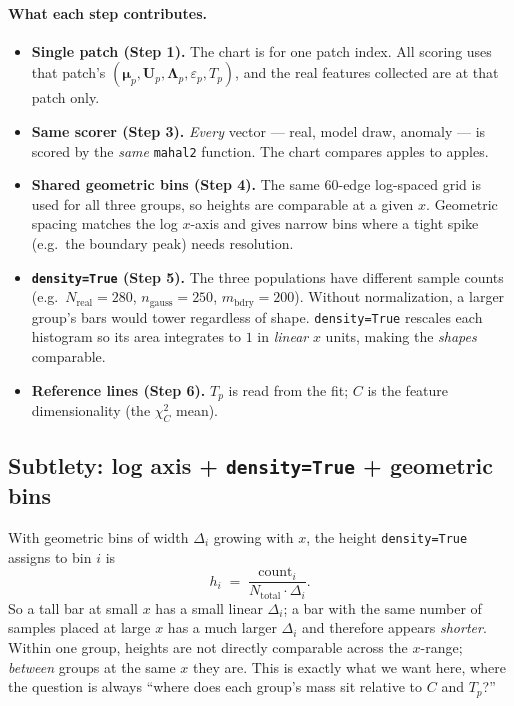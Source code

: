\documentclass[11pt]{article}
\newcommand{\code}[1]{\texttt{#1}}
\newcommand{\Up}{\mathbf{U}_p}
\newcommand{\Lp}{\boldsymbol{\Lambda}_p}
\newcommand{\bmu}{\boldsymbol{\mu}}
\begin{document}
\paragraph{What each step contributes.}

\begin{itemize}[itemsep=2pt]
  \item \textbf{Single patch (Step 1).} The chart is for one patch index. All
    scoring uses that patch's $(\bmu_p, \Up, \Lp, \varepsilon_p, T_p)$, and the
    real features collected are at that patch only.
  \item \textbf{Same scorer (Step 3).} \emph{Every} vector --- real, model
    draw, anomaly --- is scored by the \emph{same} \code{mahal2} function. The
    chart compares apples to apples.
  \item \textbf{Shared geometric bins (Step 4).} The same 60-edge log-spaced
    grid is used for all three groups, so heights are comparable at a given
    $x$. Geometric spacing matches the log $x$-axis and gives narrow bins where
    a tight spike (e.g.\ the boundary peak) needs resolution.
  \item \textbf{\code{density=True} (Step 5).} The three populations have
    different sample counts (e.g.\ $N_{\text{real}} = 280$,
    $n_{\text{gauss}} = 250$, $m_{\text{bdry}} = 200$). Without normalization, a
    larger group's bars would tower regardless of shape. \code{density=True}
    rescales each histogram so its area integrates to $1$ in \emph{linear} $x$
    units, making the \emph{shapes} comparable.
  \item \textbf{Reference lines (Step 6).} $T_p$ is read from the fit;
    $C$ is the feature dimensionality (the $\chi^2_C$ mean).
\end{itemize}

\subsection{Subtlety: log axis + \code{density=True} + geometric bins}

With geometric bins of width $\Delta_i$ growing with $x$, the height
\code{density=True} assigns to bin $i$ is
\begin{equation}
  h_i \;=\; \frac{\text{count}_i}{N_{\text{total}} \cdot \Delta_i}.
\end{equation}
So a tall bar at small $x$ has a small linear $\Delta_i$; a bar with the same
number of samples placed at large $x$ has a much larger $\Delta_i$ and therefore
appears \emph{shorter}. Within one group, heights are not directly comparable
across the $x$-range; \emph{between} groups at the same $x$ they are. This is
exactly what we want here, where the question is always
``where does each group's mass sit relative to $C$ and $T_p$?''
\end{document}
